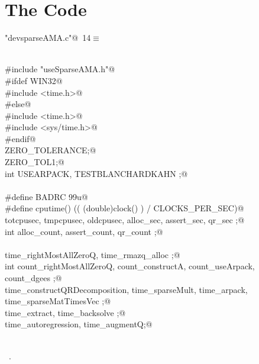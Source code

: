 \documentclass[12pt]{article}
\begin{document}
\section{The Code}
\begin{flushleft} \small
\begin{minipage}{\linewidth}\label{scrap1}\raggedright\small
{} \verb@"devsparseAMA.c"@\nobreak\ {\footnotesize {14}}$\equiv$
\vspace{-1ex}
\begin{list}{}{} \item
\mbox{}\verb@@\\
\mbox{}\verb@#include "useSparseAMA.h"@\\
\mbox{}\verb@#ifdef WIN32@\\
\mbox{}\verb@#include <time.h>@\\
\mbox{}\verb@#else@\\
\mbox{}\verb@#include <time.h>@\\
\mbox{}\verb@#include <sys/time.h>@\\
\mbox{}\verb@#endif@\\
\mbox{}\verb@double ZERO_TOLERANCE;@\\
\mbox{}\verb@double ZERO_TOL1;@\\
\mbox{}\verb@unsigned int USEARPACK, TESTBLANCHARDKAHN ;@\\
\mbox{}\verb@@\\
\mbox{}\verb@#define BADRC 99u@\\
\mbox{}\verb@#define cputime() (( (double)clock() ) / CLOCKS_PER_SEC)@\\
\mbox{}\verb@double totcpusec, tmpcpusec, oldcpusec, alloc_sec, assert_sec, qr_sec ;@\\
\mbox{}\verb@unsigned int  alloc_count, assert_count, qr_count ;@\\
\mbox{}\verb@@\\
\mbox{}\verb@double time_rightMostAllZeroQ, time_rmazq_alloc ;@\\
\mbox{}\verb@unsigned int count_rightMostAllZeroQ, count_constructA, count_useArpack, count_dgees ;@\\
\mbox{}\verb@double time_constructQRDecomposition, time_sparseMult, time_arpack, time_sparseMatTimesVec ;@\\
\mbox{}\verb@double time_extract, time_backsolve ;@\\
\mbox{}\verb@double time_autoregression, time_augmentQ;@\\
\mbox{}\verb@@\\
\mbox{}\verb@@{\NWsep}
\end{list}
\vspace{-1.5ex}
\footnotesize
\begin{list}{}{\setlength{\itemsep}{-\parsep}\setlength{\itemindent}{-\leftmargin}}
\item \NWtxtFileDefBy\ .

\item{}
\end{list}
\end{minipage}\vspace{4ex}
\end{flushleft}
\end{document}
